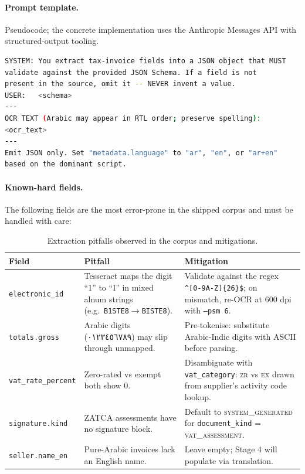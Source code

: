 \documentclass[11pt,a4paper,twoside]{report}
\newcommand{\ar}[1]{\foreignlanguage{arabic}{#1}}
\begin{document}
\paragraph{Prompt template.} Pseudocode; the concrete implementation
uses the Anthropic Messages API with structured-output tooling.

\begin{lstlisting}[language=bash,basicstyle=\ttfamily\small,caption={Schema-guided extraction prompt template.}]
SYSTEM: You extract tax-invoice fields into a JSON object that MUST
validate against the provided JSON Schema. If a field is not
present in the source, omit it -- NEVER invent a value.
USER:   <schema>
---
OCR TEXT (Arabic may appear in RTL order; preserve spelling):
<ocr_text>
---
Emit JSON only. Set "metadata.language" to "ar", "en", or "ar+en"
based on the dominant script.
\end{lstlisting}

\paragraph{Known-hard fields.} The following fields are the most error-prone
in the shipped corpus and must be handled with care:

\begin{table}[htbp]
\centering
\caption{Extraction pitfalls observed in the corpus and mitigations.}
\label{tab:pitfalls}
\small
\begin{tabularx}{\linewidth}{@{}l X X@{}}
\toprule
\textbf{Field} & \textbf{Pitfall} & \textbf{Mitigation} \\ \midrule
\texttt{electronic\_id}    & Tesseract maps the digit ``1'' to ``I'' in mixed alnum strings (e.g.\ \texttt{B1STE8}$\to$\texttt{BISTE8}). & Validate against the regex \verb|^[0-9A-Z]{26}$|; on mismatch, re-OCR at 600 dpi with \texttt{--psm~6}. \\
\texttt{totals.gross}      & Arabic digits (\ar{٠١٢٣٤٥٦٧٨٩}) may slip through unmapped. & Pre-tokenise: substitute Arabic-Indic digits with ASCII before parsing. \\
\texttt{vat\_rate\_percent}& Zero-rated vs exempt both show $0$. & Disambiguate with \texttt{vat\_category}: \textsc{zr} vs \textsc{ex} drawn from supplier's activity code lookup. \\
\texttt{signature.kind}    & ZATCA assessments have no signature block. & Default to \textsc{system\_generated} for \texttt{document\_kind} = \textsc{vat\_assessment}. \\
\texttt{seller.name\_en}   & Pure-Arabic invoices lack an English name. & Leave empty; Stage 4 will populate via translation. \\
\bottomrule
\end{tabularx}
\end{table}
\end{document}
